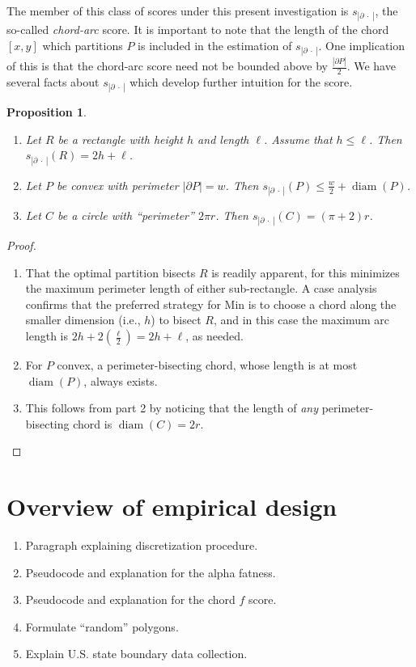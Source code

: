 \documentclass[draft]{jocg}
\newcommand{\abs}[1]{|#1|}
\newcommand{\chordarc}{s_{\abs{\partial~\cdot~}}}
\DeclareMathOperator{\diam}{\mathrm{diam}}
\newtheorem{proposition}{Proposition}[section]
\theoremstyle{definition}
\theoremstyle{remark}
\begin{document}
The member of this class of scores under this present investigation is
$\chordarc$, the so-called \emph{chord-arc} score. It is important to note that
the length of the chord $[x,y]$ which partitions $P$ is included in the
estimation of $\chordarc$. One implication of this is that the chord-arc score
need not be bounded above by $\frac{\abs{\partial P}}{2}$.  We have several
facts about $\chordarc$ which develop further intuition for the score.
\begin{proposition}
  \begin{enumerate}
    \item Let $R$ be a rectangle with height $h$ and length $\ell$. Assume that
      $h \leq \ell$. Then $\chordarc(R) = 2h + \ell$.
    \item Let $P$ be convex with perimeter $\abs{\partial P} = w$. Then
      $\chordarc(P) \leq \frac{w}{2} + \diam (P)$.
    \item Let $C$ be a circle with ``perimeter'' $2\pi r$. Then $\chordarc(C) =
      (\pi + 2)r$.
  \end{enumerate}
  \label{rem:chordarc}
\end{proposition}

\begin{proof}
  \begin{enumerate}
    \item That the optimal partition bisects $R$ is readily apparent,
      for this minimizes the maximum perimeter length of either sub-rectangle.
      A case analysis confirms that the preferred strategy for Min is to choose
      a chord along the smaller dimension (i.e., $h$) to bisect $R$, and in this
      case the maximum arc length is $2h + 2\left( \frac{\ell}{2} \right) = 2h +
      \ell$, as needed.
    \item For $P$ convex, a perimeter-bisecting chord, whose length is at most
      $\diam(P)$, always exists. 
    \item This follows from part 2 by noticing that the length of \emph{any}
      perimeter-bisecting chord is $\diam(C) = 2r$. \qedhere
  \end{enumerate}
\end{proof}

\section{Overview of empirical design}

\begin{enumerate}
  \item Paragraph explaining discretization procedure.
  \item Pseudocode and explanation for the alpha fatness.
  \item Pseudocode and explanation for the chord $f$ score.
  \item Formulate ``random'' polygons.
  \item Explain U.S. state boundary data collection.
\end{enumerate}
\end{document}

